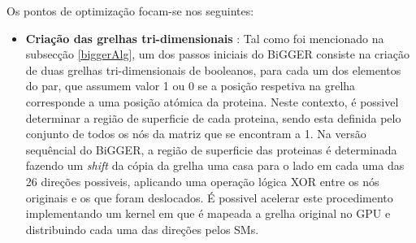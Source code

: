 Os pontos de optimização focam-se nos seguintes:
\begin{itemize}
\item{\textbf{Criação das grelhas tri-dimensionais}} : 
Tal como foi mencionado na subsecção \ref{biggerAlg}, um dos passos iniciais do BiGGER consiste na criação de duas grelhas tri-dimensionais de booleanos, para cada um dos elementos do par, que assumem valor 1 ou 0 se a posição respetiva na grelha corresponde a uma posição atómica da proteina. Neste contexto, é possivel determinar a região de superficie de cada proteina, sendo esta definida pelo conjunto de todos os nós da matriz que se encontram a 1. Na versão sequêncial do BiGGER, a região de superficie das proteinas é determinada fazendo um \textit{shift} da cópia da grelha uma casa para o lado em cada uma das 26 direções possiveis, aplicando uma operação lógica XOR entre os nós originais e os que foram deslocados. É possivel acelerar este procedimento implementando um kernel em que é mapeada a grelha original no GPU e distribuindo cada uma das direções pelos SMs.

%
%


\end{itemize}
